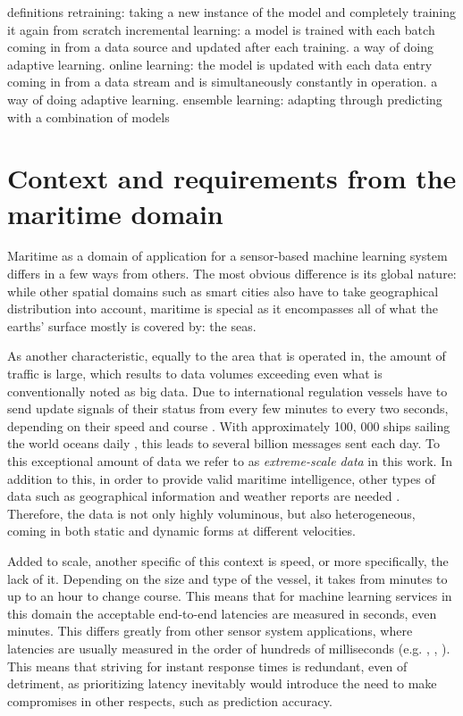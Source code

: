 definitions
 retraining: taking a new instance of the model and completely training it again from scratch
	    incremental learning: a model is trained with each batch coming in from a data source and updated after each training. a way of doing adaptive learning.
	    online learning: the model is updated with each data entry coming in from a data stream and is simultaneously constantly in operation. a way of doing adaptive learning.
	    ensemble learning: adapting through predicting with a combination of models



\section{Context and requirements from the maritime domain}
Maritime as a domain of application for a sensor-based machine learning system differs in a few ways from others. The most obvious difference is its global nature: while other spatial domains such as smart cities also have to take geographical distribution into account, maritime is special as it encompasses all of what the earths' surface mostly is covered by: the seas. 

As another characteristic, equally to the area that is operated in, the amount of traffic is large, which results to data volumes exceeding even what is conventionally noted as big data. Due to international regulation vessels have to send update signals of their status from every few minutes to every two seconds, depending on their speed and course \cite{maritimeinformatics}. With approximately 100, 000 ships sailing the world oceans daily \cite{maritimeinformatics}, this leads to several billion messages sent each day. To this exceptional amount of data we refer to as \textit{extreme-scale data} in this work. In addition to this, in order to provide valid maritime intelligence, other types of data such as geographical information and weather reports are needed \cite{D1.1}. Therefore, the data is not only highly voluminous, but also heterogeneous, coming in both static and dynamic forms at different velocities.

Added to scale, another specific of this context is speed, or more specifically, the lack of it. Depending on the size and type of the vessel, it takes from minutes to up to an hour to change course. This means that for machine learning services in this domain the acceptable end-to-end latencies are measured in seconds, even minutes. This differs greatly from other sensor system applications, where latencies are usually measured in the order of hundreds of milliseconds (e.g. \cite{anomalysystem}, \cite{facebook}, \cite{edgelatency}). This means that striving for instant response times is redundant, even of detriment, as prioritizing latency inevitably would introduce the need to make compromises in other respects, such as prediction accuracy.

